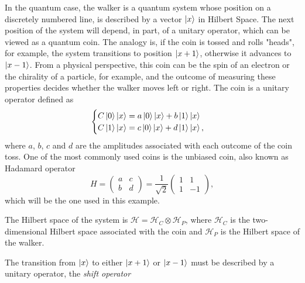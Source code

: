 \documentclass[../../dissertation.tex]{subfiles}
\begin{document}
In the quantum case, the walker is a quantum system whose position on a discretely numbered line, is described by a vector $\ket{x}$ in Hilbert Space. The next position of the system will depend, in part, of a unitary operator, which can be viewed as a quantum coin.
The analogy is, if the coin is tossed and rolls "heads", for example, the system transitions to position $\ket{x+1}$, otherwise it advances to $\ket{x-1}$. From a physical perspective, this coin can be the spin of an electron or the chirality of a particle, for example, and the outcome of measuring these properties decides whether the walker moves left or right. The coin is a unitary operator defined as
\begin{equation}
	\begin{cases}
		C\ket{0}\ket{x} = a\ket{0}\ket{x} + b\ket{1}\ket{x}\\
		C\ket{1}\ket{x} = c\ket{0}\ket{x} + d\ket{1}\ket{x},
	\end{cases}
\end{equation}
where $a$, $b$, $c$ and $d$ are the amplitudes associated with each outcome of the coin toss. One of the most commonly used coins is the unbiased coin, also known as Hadamard operator
\begin{equation}
	H = \begin{pmatrix} 
		a & c\\
		b & d
	    \end{pmatrix}
	    =\frac{1}{\sqrt{2}} \begin{pmatrix}
			    		1 & 1\\
					1 & -1
	   		       \end{pmatrix},
\end{equation}
which will be the one used in this example.\par 
The Hilbert space of the system is $\mathscr{H} = \mathscr{H}_{C} \otimes \mathscr{H}_{P}$, where $\mathscr{H}_{C}$ is the two-dimensional Hilbert space associated with the coin and $\mathscr{H}_P$ is the Hilbert space of the walker.\par
The transition from $\ket{x}$ to either $\ket{x+1}$ or $\ket{x-1}$ must be described by a unitary operator, the \textit{shift operator} 
\end{document}
